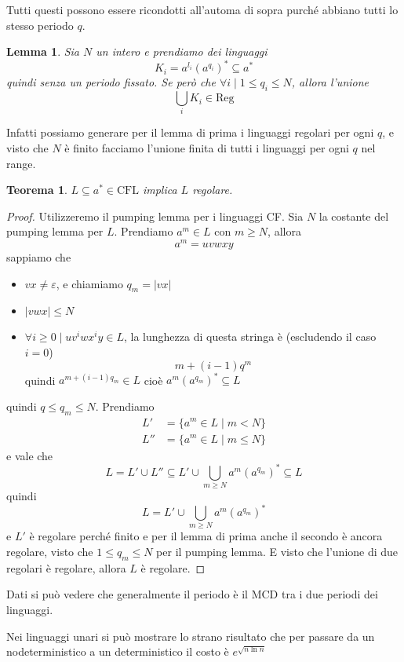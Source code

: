 \documentclass[12pt]{report}
\newtheorem{teorema}{Teorema}
\newtheorem{lemma}{Lemma}
\theoremstyle{definition}
\begin{document}
Tutti questi possono essere ricondotti all'automa di sopra purché abbiano tutti lo stesso periodo $q$.

\begin{lemma}
	Sia $N$ un intero e prendiamo dei linguaggi
	$$ K_i = a^{l_i} (a^{q_i})^* \subseteq a^* $$
	quindi senza un periodo fissato.
	Se però che $\forall i \mid 1 \leq q_i \leq N$, allora l'unione
	$$ \bigcup_i K_i \in \text{Reg} $$
\end{lemma}
Infatti possiamo generare per il lemma di prima i linguaggi regolari per ogni $q$, e visto che $N$ è finito facciamo l'unione finita di tutti i linguaggi per ogni $q$ nel range.

\begin{teorema}
	$L \subseteq a^* \in \text{CFL}$ implica $L$ regolare.
\end{teorema}
\begin{proof}
	Utilizzeremo il pumping lemma per i linguaggi CF.
	Sia $N$ la costante del pumping lemma per $L$.
	Prendiamo $a^m \in L$ con $m \geq N$, allora
	$$ a^m = u v w x y $$
	sappiamo che
	\begin{itemize}
		\item $vx \neq \varepsilon$, e chiamiamo $q_m = |vx|$
		\item $|vwx| \leq N$
		\item $\forall i \geq 0 \mid u v^i w x^i y \in L$, la lunghezza di questa stringa è (escludendo il caso $i = 0$) 
			$$ m + (i - 1)q^m $$
			quindi $a^{m + (i - 1)q_m} \in L $
			cioè $a^m (a^{q_m})^* \subseteq L$
	\end{itemize}
	quindi $q \leq q_m \leq N$.
	Prendiamo
	\begin{align*}
		L' &= \{ a^m \in L \mid m < N \} \\
		L'' &= \{ a^m \in L \mid m \leq N \} 
	\end{align*}
	e vale che
	$$ L = L' \cup L'' \subseteq L' \cup \bigcup_{m \geq N} a^m (a^{q_m})^* \subseteq L $$
	quindi
	$$ L = L' \cup \bigcup_{m \geq N} a^m(a^{q_m})^* $$
	e $L'$ è regolare perché finito e per il lemma di prima anche il secondo è ancora regolare, visto che $1 \leq q_m \leq N$ per il pumping lemma.
	E visto che l'unione di due regolari è regolare, allora $L$ è regolare.
\end{proof}
Dati 
si può vedere che generalmente il periodo è il $\text{MCD}$ tra i due periodi dei linguaggi.

Nei linguaggi unari si può mostrare lo strano risultato che per passare da un nodeterministico a un deterministico il costo è $e^{\sqrt{n \ln{n}}}$
\end{document}
